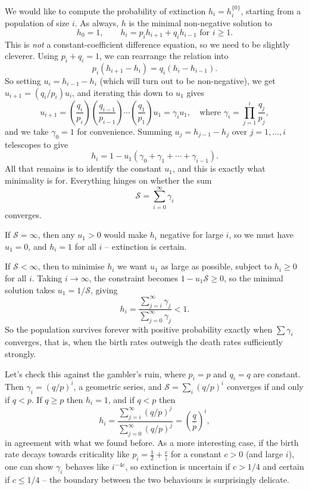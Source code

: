 We would like to compute the probability of extinction $h_i = h_i^{\{0\}}$, starting from a population of size $i$. As always, $h$ is the minimal non-negative solution to
$$
h_0 = 1, \qquad h_i = p_i h_{i + 1} + q_i h_{i - 1} \text{ for } i \geq 1.
$$
This is \emph{not} a constant-coefficient difference equation, so we need to be slightly cleverer. Using $p_i + q_i = 1$, we can rearrange the relation into
$$
p_i (h_{i + 1} - h_i) = q_i (h_i - h_{i - 1}).
$$
So setting $u_i = h_{i - 1} - h_i$ (which will turn out to be non-negative), we get $u_{i + 1} = (q_i/p_i) u_i$, and iterating this down to $u_1$ gives
$$
u_{i + 1} = \left(\frac{q_i}{p_i}\right)\left(\frac{q_{i - 1}}{p_{i - 1}}\right) \cdots \left(\frac{q_1}{p_1}\right) u_1 = \gamma_i u_1, \quad \text{where } \gamma_i = \prod_{j = 1}^{i} \frac{q_j}{p_j},
$$
and we take $\gamma_0 = 1$ for convenience. Summing $u_j = h_{j - 1} - h_j$ over $j = 1, \dots, i$ telescopes to give
$$
h_i = 1 - u_1(\gamma_0 + \gamma_1 + \cdots + \gamma_{i - 1}).
$$
All that remains is to identify the constant $u_1$, and this is exactly what minimality is for. Everything hinges on whether the sum
$$
	\mathcal{S} = \sum_{i = 0}^{\infty} \gamma_i
$$
converges.

If $\mathcal{S} = \infty$, then any $u_1 > 0$ would make $h_i$ negative for large $i$, so we must have $u_1 = 0$, and $h_i = 1$ for all $i$ -- extinction is certain.

If $\mathcal{S} < \infty$, then to minimise $h_i$ we want $u_1$ as large as possible, subject to $h_i \geq 0$ for all $i$. Taking $i \rightarrow \infty$, the constraint becomes $1 - u_1 \mathcal{S} \geq 0$, so the minimal solution takes $u_1 = 1/\mathcal{S}$, giving
$$
h_i = \frac{\sum_{j = i}^{\infty} \gamma_j}{\sum_{j = 0}^{\infty} \gamma_j} < 1.
$$
So the population survives forever with positive probability exactly when $\sum \gamma_i$ converges, that is, when the birth rates outweigh the death rates sufficiently strongly.

\begin{example}
	Let's check this against the gambler's ruin, where $p_i = p$ and $q_i = q$ are constant. Then $\gamma_i = (q/p)^i$, a geometric series, and $\mathcal{S} = \sum_i (q/p)^i$ converges if and only if $q < p$. If $q \geq p$ then $h_i = 1$, and if $q < p$ then
	$$
	h_i = \frac{\sum_{j = i}^{\infty}(q/p)^j}{\sum_{j = 0}^{\infty}(q/p)^j} = \left(\frac{q}{p}\right)^i,
	$$
	in agreement with what we found before. As a more interesting case, if the birth rate decays towards criticality like $p_i = \frac{1}{2} + \frac{c}{i}$ for a constant $c > 0$ (and large $i$), one can show $\gamma_i$ behaves like $i^{-4c}$, so extinction is uncertain if $c > 1/4$ and certain if $c \leq 1/4$ -- the boundary between the two behaviours is surprisingly delicate.
\end{example}

